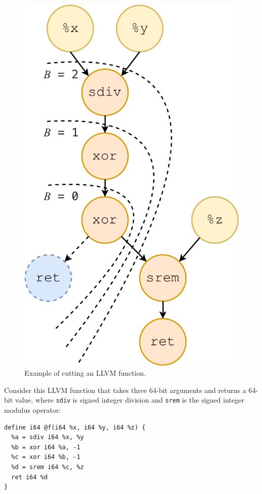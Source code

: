 \begin{figure}[tbp]
  \centering
  \includegraphics[width=0.8\linewidth]{figures/cut-depth.pdf}
  \caption{Example of cutting an LLVM function.}
  \label{fig:cut-depth}
\end{figure}

Consider this LLVM function that takes three 64-bit arguments and
returns a 64-bit value, where \texttt{sdiv} is signed integer division
and \texttt{srem} is the signed integer modulus operator:


{\begin{quoting}
\begin{Verbatim}
define i64 @f(i64 %x, i64 %y, i64 %z) {
  %a = sdiv i64 %x, %y
  %b = xor i64 %a, -1
  %c = xor i64 %b, -1
  %d = srem i64 %c, %z
  ret i64 %d
}
\end{Verbatim}
\end{quoting}}

